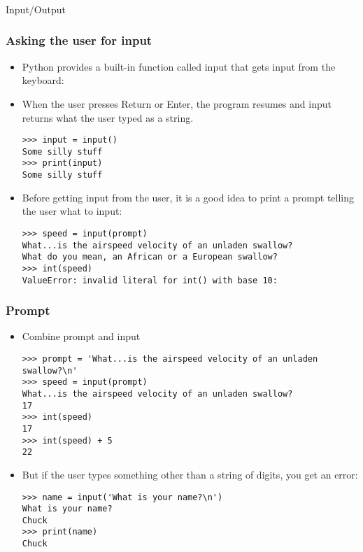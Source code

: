 \begin{frame}[fragile]\frametitle{}
\begin{center}
{\Large Input/Output}
\end{center}
\end{frame}


\begin{frame}[fragile]\frametitle{Asking the user for input}
\begin{itemize}
\item  Python provides a built-in function called input that gets input from
the keyboard:
\item When the user presses Return or Enter, the program
resumes and input returns what the user typed as a string.
\begin{lstlisting}
>>> input = input()
Some silly stuff
>>> print(input)
Some silly stuff
\end{lstlisting}
\item Before getting input from the user, it is a good idea to print a prompt telling the
user what to input:
\begin{lstlisting}
>>> speed = input(prompt)
What...is the airspeed velocity of an unladen swallow?
What do you mean, an African or a European swallow?
>>> int(speed)
ValueError: invalid literal for int() with base 10:
\end{lstlisting}
\end{itemize}
\end{frame}

\begin{frame}[fragile]\frametitle{Prompt}
\begin{itemize}
\item  Combine prompt and input
\begin{lstlisting}
>>> prompt = 'What...is the airspeed velocity of an unladen swallow?\n'
>>> speed = input(prompt)
What...is the airspeed velocity of an unladen swallow?
17
>>> int(speed)
17
>>> int(speed) + 5
22
\end{lstlisting}
\item But if the user types something other than a string of digits, you get an error:
\begin{lstlisting}
>>> name = input('What is your name?\n')
What is your name?
Chuck
>>> print(name)
Chuck
\end{lstlisting}
\end{itemize}
\end{frame}

